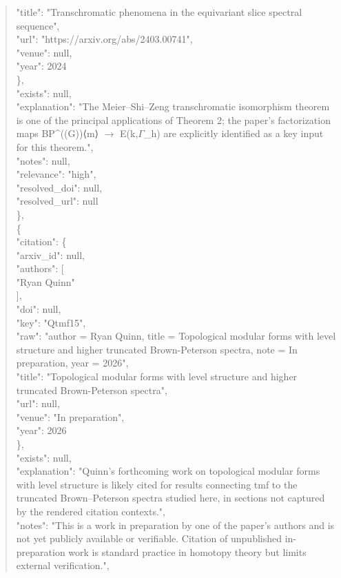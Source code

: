 \documentclass[11pt]{article}
\begin{document}
\begin{quote}
        "title": "Transchromatic phenomena in the equivariant slice spectral sequence",\\
        "url": "https://arxiv.org/abs/2403.00741",\\
        "venue": null,\\
        "year": 2024\\
      \},\\
      "exists": null,\\
      "explanation": "The Meier--Shi--Zeng transchromatic isomorphism theorem is one of the principal applications of Theorem 2; the paper's factorization maps BP\^{}((G))⟨m⟩ \ensuremath{\to} E(k,\ensuremath{\Gamma}\_h) are explicitly identified as a key input for this theorem.",\\
      "notes": null,\\
      "relevance": "high",\\
      "resolved\_doi": null,\\
      "resolved\_url": null\\
    \},\\
    \{\\
      "citation": \{\\
        "arxiv\_id": null,\\
        "authors": [\\
          "Ryan Quinn"\\
        ],\\
        "doi": null,\\
        "key": "Qtmf15",\\
        "raw": "author = Ryan Quinn, title = Topological modular forms with level structure and higher truncated Brown-Peterson spectra, note = In preparation, year = 2026",\\
        "title": "Topological modular forms with level structure and higher truncated Brown-Peterson spectra",\\
        "url": null,\\
        "venue": "In preparation",\\
        "year": 2026\\
      \},\\
      "exists": null,\\
      "explanation": "Quinn's forthcoming work on topological modular forms with level structure is likely cited for results connecting tmf to the truncated Brown--Peterson spectra studied here, in sections not captured by the rendered citation contexts.",\\
      "notes": "This is a work in preparation by one of the paper's authors and is not yet publicly available or verifiable. Citation of unpublished in-preparation work is standard practice in homotopy theory but limits external verification.",\\

\end{quote}
\end{document}
